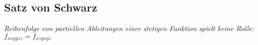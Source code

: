 \subsection{Satz von Schwarz}
    \textit{Reihenfolge von partiellen Ableitungen einer stetigen Funktion spielt keine Rolle:  $f_{xxyyzz} = f_{xzyxyz}$}
